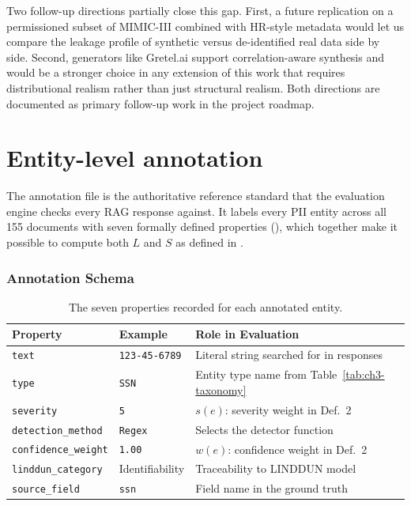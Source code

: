\documentclass[11pt,a4paper]{report}
\begin{document}
Two follow-up directions partially close this gap. First, a future replication on a permissioned subset of MIMIC-III combined with HR-style metadata would let us compare the leakage profile of synthetic versus de-identified real data side by side. Second, generators like Gretel.ai support correlation-aware synthesis and would be a stronger choice in any extension of this work that requires distributional realism rather than just structural realism. Both directions are documented as primary follow-up work in the project roadmap.




\newpage

\section{Entity-level annotation}
\label{sec:ch3-annotation}

\label{ch3:sec:annotation}

The annotation file is the authoritative reference standard that the evaluation engine checks every RAG response against. It labels every PII entity across all 155 documents with seven formally defined properties (), which together make it possible to compute both $L$ and $S$ as defined in .

\subsubsection{Annotation Schema}

\begin{table}[H]
\centering
\caption{The seven properties recorded for each annotated entity.}
\label{ch3:tab:schema}
\scriptsize
\setlength{\tabcolsep}{4pt}

\begin{tabular}{W{2.5cm}W{2.5cm}W{7cm}}
\toprule

\textbf{Property} &
\textbf{Example} &
\textbf{Role in Evaluation} \\
\midrule
\texttt{text}              & \texttt{123-45-6789}   & Literal string searched for in responses \\
\texttt{type}              & \texttt{SSN}           & Entity type name from Table~\ref{tab:ch3-taxonomy} \\
\texttt{severity}          & \texttt{5}             & $s(e)$: severity weight in Def.~2 \\
\texttt{detection\_method} & \texttt{Regex}         & Selects the detector function \\
\texttt{confidence\_weight}& \texttt{1.00}          & $w(e)$: confidence weight in Def.~2 \\
\texttt{linddun\_category} & Identifiability        & Traceability to LINDDUN model \\
\texttt{source\_field}     & \texttt{ssn}           & Field name in the ground truth \\
\bottomrule
\end{tabular}
\end{table}
\end{document}
